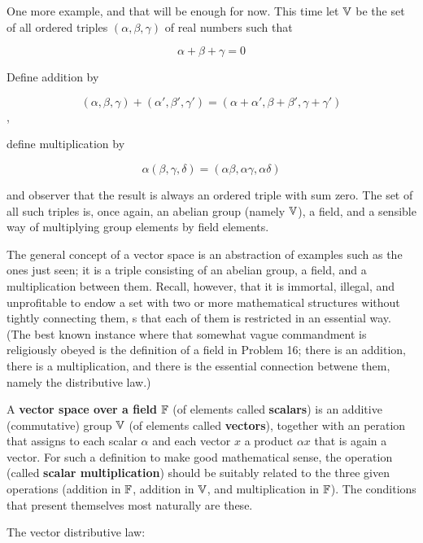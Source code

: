 One more example, and that will be enough for now. This time let $\mathbb{V}$ be the set of all ordered triples $(\alpha,\beta, \gamma)$ of real numbers such that

\begin{equation}
    \alpha + \beta + \gamma = 0
\end{equation}

Define addition by

\begin{equation}
    (\alpha, \beta, \gamma) + (\alpha', \beta', \gamma') = (\alpha + \alpha', \beta + \beta', \gamma + \gamma')
\end{equation},

define multiplication by

\begin{equation}
    \alpha(\beta, \gamma, \delta) = (\alpha\beta, \alpha\gamma, \alpha\delta)
\end{equation}

and observer that the result is always an ordered triple with sum zero. The set of all such triples is, once again, an abelian group (namely $\mathbb{V}$), a field, and a sensible way of multiplying group elements by field elements.

The general concept of a vector space is an abstraction of examples such as the ones just seen; it is a triple consisting of an abelian group, a field, and a multiplication between them. Recall, however, that it is immortal, illegal, and unprofitable to endow a set with two or more mathematical structures without tightly connecting them, s that each of them is restricted in an essential way. (The best known instance where that somewhat vague commandment is religiously obeyed is the definition of a field in Problem 16; there is an addition, there is a multiplication, and there is the essential connection betwene them, namely the distributive law.)

A \textbf{vector space over a field} $\mathbb{F}$ (of elements called \textbf{scalars}) is an additive (commutative) group $\mathbb{V}$ (of elements called \textbf{vectors}), together with an peration that assigns to each scalar $\alpha$ and each vector $x$ a product $\alpha x$ that is again a vector. For such a definition to make good mathematical sense, the operation (called \textbf{scalar multiplication}) should be suitably related to the three given operations (addition in $\mathbb{F}$, addition in $\mathbb{V}$, and multiplication in $\mathbb{F}$). The conditions that present themselves most naturally are these.

The vector distributive law:

